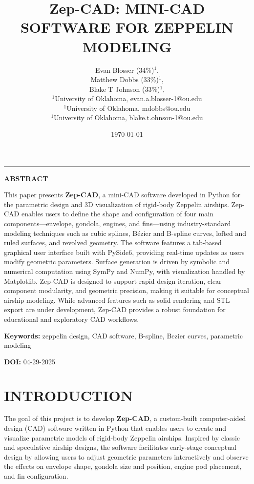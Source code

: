 \documentclass[10pt]{article}
\title{\bfseries Zep-CAD: MINI-CAD SOFTWARE FOR ZEPPELIN MODELING}
\author{
    Evan Blosser (34\%)$^{1}$, \\
    Matthew Dobbs (33\%)$^{1}$, \\
    Blake T Johnson (33\%)$^{1}$,  \\
{\small $^{1}$University of Oklahoma, evan.a.blosser-1@ou.edu} \\
{\small $^{1}$University of Oklahoma, mdobbs@ou.edu} \\
{\small $^{1}$University of Oklahoma, blake.t.ohnson-1@ou.edu} \\
}
\date{\today}
\begin{document}


\maketitle


\vspace{-1em}
\noindent\rule{\textwidth}{0.4pt}


\begin{center}
    \textbf{ABSTRACT}
\end{center}
{\small
This paper presents \textbf{Zep-CAD}, a mini-CAD software developed in Python for the parametric design and 3D 
visualization of rigid-body Zeppelin airships. Zep-CAD enables users to define the shape and configuration of 
four main components—envelope, gondola, engines, and fins—using industry-standard modeling techniques such as 
cubic splines, Bézier and B-spline curves, lofted and ruled surfaces, and revolved geometry. The software 
features a tab-based graphical user interface built with PySide6, providing real-time updates as users modify 
geometric parameters. Surface generation is driven by symbolic and numerical computation using SymPy and NumPy, 
with visualization handled by Matplotlib. Zep-CAD is designed to support rapid design iteration, clear component 
modularity, and geometric precision, making it suitable for conceptual airship modeling. While advanced features 
such as solid rendering and STL export are under development, Zep-CAD provides a robust foundation for educational 
and exploratory CAD workflows.
}

    

\vspace{1em}
\noindent
\textbf{Keywords:} zeppelin design, CAD software, B-spline, Bezier curves, parametric modeling

\vspace{0.5em}
\noindent
\textbf{DOI:} 04-29-2025



\section{INTRODUCTION}

The goal of this project is to develop \textbf{Zep-CAD}, a custom-built computer-aided design (CAD) software 
written in Python that enables users to create and visualize parametric models of rigid-body Zeppelin airships. 
Inspired by classic and speculative airship designs, the software facilitates early-stage conceptual design by 
allowing users to adjust geometric parameters interactively and observe the effects on envelope shape, gondola 
size and position, engine pod placement, and fin configuration.
\end{document}
